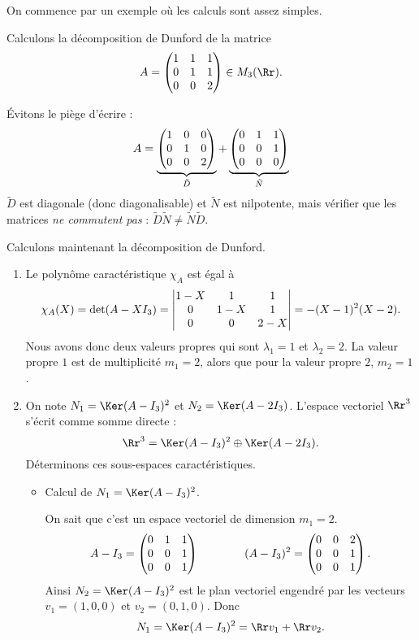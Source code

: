 \documentclass[12pt, class=report,crop=false]{standalone}
\begin{document}
On commence par un exemple où les calculs sont assez simples.
\begin{exemple}
Calculons la décomposition de Dunford de la matrice 
$$A=\begin{pmatrix}1&1&1\cr 0&1&1\cr 0&0&2\end{pmatrix} \in M_3(\Rr).$$


\'Evitons le piège d'écrire :
$$A=\underbrace{\begin{pmatrix}1&0&0\cr 0&1&0\cr 0&0&2\end{pmatrix}}_{\tilde D}
+\underbrace{\begin{pmatrix}0&1&1\cr 0&0&1\cr 0&0&0\end{pmatrix}}_{\tilde N}$$
$\tilde D$ est diagonale (donc diagonalisable) et $\tilde N$ est nilpotente,
mais vérifier que les matrices \emph{ne commutent pas} :  
$\tilde D \tilde N \neq \tilde N \tilde D$.

\bigskip 
Calculons maintenant la décomposition de Dunford.

\begin{enumerate}
  \item Le polynôme caractéristique $\chi_A$ est égal à
$$\chi_A(X) 
= \det(A-XI_3) 
= \begin{vmatrix}1-X & 1 & 1\cr 0 & 1-X & 1\cr 0 & 0 & 2-X\end{vmatrix}
= -(X-1)^2(X-2).$$
Nous avons donc deux valeurs propres qui sont $\lambda_1 = 1$ et $\lambda_2 = 2$. 
La valeur propre $1$ est de multiplicité $m_1=2$, alors que pour la valeur propre $2$, $m_2=1$.

  \item On note $N_1 = \Ker(A-I_3)^2$ et $N_2 = \Ker(A-2I_3)$. 
 L'espace vectoriel $\Rr^3$ s'écrit comme somme directe :
$$\Rr^3=\Ker(A-I_3)^2\oplus\Ker(A-2I_3).$$
Déterminons ces sous-espaces caractéristiques. 
  \begin{itemize}
    \item Calcul de $N_1 = \Ker(A-I_3)^2$.
    
  On sait que c'est un espace vectoriel de dimension $m_1=2$.
$$A-I_3 = \begin{pmatrix}0&1&1\cr0&0&1\cr0&0&1\end{pmatrix}\qquad \qquad 
(A-I_3)^2 = \begin{pmatrix}0&0&2\cr0&0&1\cr0&0&1\end{pmatrix}.$$
Ainsi $N_2 = \Ker(A-I_3)^2$ est le plan vectoriel engendré par les vecteurs $v_1=(1,0,0)$ et $v_2=(0,1,0)$.
Donc 
$$N_1=\Ker(A-I_3)^2=\Rr v_1 + \Rr v_2.$$


\end{itemize}
\end{enumerate}
\end{exemple}
\end{document}

